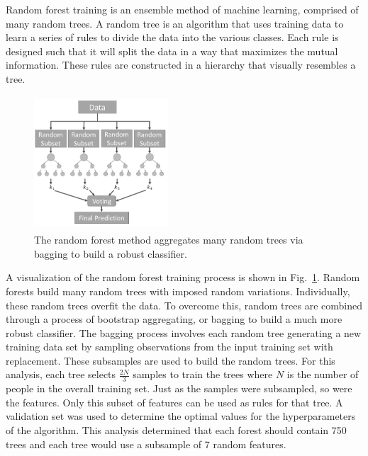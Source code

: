 \documentclass[10pt,twocolumn,conference]{IEEEtran}
\begin{document}
Random forest training is an ensemble method of machine learning, comprised of many random trees.
A random tree is an algorithm that uses training data to learn a series of rules to divide the data into the various classes.
Each rule is designed such that it will split the data in a way that maximizes the mutual information.
These rules are constructed in a hierarchy that visually resembles a tree.



\begin{figure}[t]
	\centering
	\includegraphics[width=5cm,height=5cm,keepaspectratio,trim={0mm 2.5mm 0mm 2mm},clip]{RandForest_BW}
	\caption{The random forest method aggregates many random trees via bagging to build a robust classifier.}
	\vspace{-15pt}
	\label{fig:rand_forest}
\end{figure}  


A visualization of the random forest training process is shown in Fig.~\ref{fig:rand_forest}.
Random forests build many random trees with imposed random variations.
Individually, these random trees overfit the data.
To overcome this, random trees are combined through a process of bootstrap aggregating, or bagging to build a much more robust classifier.
The bagging process involves each random tree generating a new training data set by sampling observations from the input training set with replacement.
These subsamples are used to build the random trees.
For this analysis, each tree selects $\frac{2N}{3}$ samples to train the trees where $N$ is the number of people in the overall training set.
Just as the samples were subsampled, so were the features.
Only this subset of features can be used as rules for that tree.
A validation set was used to determine the optimal values for the hyperparameters of the algorithm.
This analysis determined that each forest should contain 750 trees and each tree would use a subsample of 7 random features.
\end{document}
